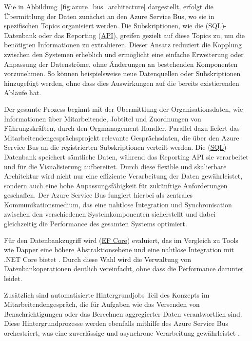 Wie in Abbildung~\ref{fig:azure_bus_architecture} dargestellt, erfolgt die Übermittlung der Daten zunächst an den Azure Service Bus, wo sie in spezifischen Topics organisiert werden. Die Subskriptionen, wie die (\hyperref[abkuerzungen]{SQL})-Datenbank oder das Reporting (\hyperref[abkuerzungen]{API}), greifen gezielt auf diese Topics zu, um die benötigten Informationen zu extrahieren. Dieser Ansatz reduziert die Kopplung zwischen den Systemen erheblich und ermöglicht eine einfache Erweiterung oder Anpassung der Datenströme, ohne Änderungen an bestehenden Komponenten vorzunehmen. So können beispielsweise neue Datenquellen oder Subskriptionen hinzugefügt werden, ohne dass dies Auswirkungen auf die bereits existierenden Abläufe hat.

Der gesamte Prozess beginnt mit der Übermittlung der Organisationsdaten, wie Informationen über Mitarbeitende, Jobtitel und Zuordnungen von Führungskräften, durch den Orgmanagement-Handler. Parallel dazu liefert das Mitarbeitendengesprächsprojekt relevante Gesprächsdaten, die über den Azure Service Bus an die registrierten Subskriptionen verteilt werden. Die (\hyperref[abkuerzungen]{SQL})-Datenbank speichert sämtliche Daten, während das Reporting API sie verarbeitet und für die Visualisierung aufbereitet. Durch diese flexible und skalierbare Architektur wird nicht nur eine effiziente Verarbeitung der Daten gewährleistet, sondern auch eine hohe Anpassungsfähigkeit für zukünftige Anforderungen geschaffen. Der Azure Service Bus fungiert hierbei als zentrales Kommunikationsmedium, das eine nahtlose Integration und Synchronisation zwischen den verschiedenen Systemkomponenten sicherstellt und dabei gleichzeitig die Performance des gesamten Systems optimiert.

Für den Datenbankzugriff wird (\hyperref[abkuerzungen]{EF Core}) evaluiert, das im Vergleich zu Tools wie Dapper eine höhere Abstraktionsebene und eine nahtlose Integration mit .NET Core bietet \cite{entityFrameworkCore2020}. Durch diese Wahl wird die Verwaltung von Datenbankoperationen deutlich vereinfacht, ohne dass die Performance darunter leidet.

Zusätzlich sind automatisierte Hintergrundjobs Teil des Konzepts im Mitarbeitendengespräch, die für Aufgaben wie das Versenden von Benachrichtigungen oder das Berechnen aggregierter Daten verantwortlich sind. Diese Hintergrundprozesse werden ebenfalls mithilfe des Azure Service Bus orchestriert, was eine zuverlässige und asynchrone Verarbeitung gewährleistet \cite{backgroundTasks2017}.

